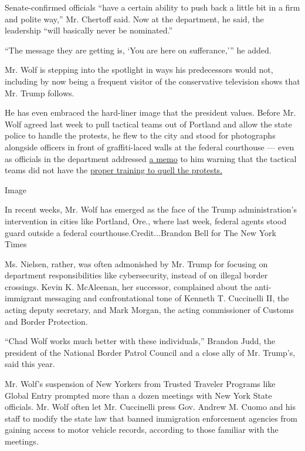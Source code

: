 Senate-confirmed officials ``have a certain ability to push back a
little bit in a firm and polite way,'' Mr. Chertoff said. Now at the
department, he said, the leadership ``will basically never be
nominated.''

``The message they are getting is, `You are here on sufferance,''' he
added.

Mr. Wolf is stepping into the spotlight in ways his predecessors would
not, including by now being a frequent visitor of the conservative
television shows that Mr. Trump follows.

He has even embraced the hard-liner image that the president values.
Before Mr. Wolf agreed last week to pull tactical teams out of Portland
and allow the state police to handle the protests, he flew to the city
and stood for photographs alongside officers in front of graffiti-laced
walls at the federal courthouse --- even as officials in the department
addressed
\href{https://int.nyt.com/data/documenttools/dh-stacticalagent-memo1/d490e392eab7d7d6/full.pdf}{a
memo} to him warning that the tactical teams did not have the
\href{https://www.nytimes.com/2020/07/18/us/portland-protests.html}{proper
training to quell the protests.}

Image

In recent weeks, Mr. Wolf has emerged as the face of the Trump
administration's intervention in cities like Portland, Ore., where last
week, federal agents stood guard outside a federal
courthouse.Credit...Brandon Bell for The New York Times

Ms. Nielsen, rather, was often admonished by Mr. Trump for focusing on
department responsibilities like cybersecurity, instead of on illegal
border crossings. Kevin K. McAleenan, her successor, complained about
the anti-immigrant messaging and confrontational tone of Kenneth T.
Cuccinelli II, the acting deputy secretary, and Mark Morgan, the acting
commissioner of Customs and Border Protection.

``Chad Wolf works much better with these individuals,'' Brandon Judd,
the president of the National Border Patrol Council and a close ally of
Mr. Trump's, said this year.

Mr. Wolf's suspension of New Yorkers from Trusted Traveler Programs like
Global Entry prompted more than a dozen meetings with New York State
officials. Mr. Wolf often let Mr. Cuccinelli press Gov. Andrew M. Cuomo
and his staff to modify the state law that banned immigration
enforcement agencies from gaining access to motor vehicle records,
according to those familiar with the meetings.


